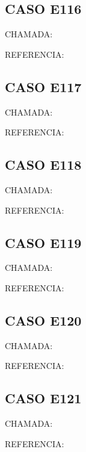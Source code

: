 \documentclass{undftex}
\begin{document}
\begin{refsection}\section*{CASO E116}\noindent CHAMADA:  \par\noindent REFERENCIA:\par\printbibliography[heading=none,check=undfconsultadas]\end{refsection}\clearpage
\begin{refsection}\section*{CASO E117}\noindent CHAMADA:  \par\noindent REFERENCIA:\par\printbibliography[heading=none,check=undfconsultadas]\end{refsection}\clearpage
\begin{refsection}\section*{CASO E118}\noindent CHAMADA:  \par\noindent REFERENCIA:\par\printbibliography[heading=none,check=undfconsultadas]\end{refsection}\clearpage
\begin{refsection}\section*{CASO E119}\noindent CHAMADA:  \par\noindent REFERENCIA:\par\printbibliography[heading=none,check=undfconsultadas]\end{refsection}\clearpage
\begin{refsection}\section*{CASO E120}\noindent CHAMADA:  \par\noindent REFERENCIA:\par\printbibliography[heading=none,check=undfconsultadas]\end{refsection}\clearpage
\begin{refsection}\section*{CASO E121}\noindent CHAMADA:  \par\noindent REFERENCIA:\par\printbibliography[heading=none,check=undfconsultadas]\end{refsection}\clearpage
\end{document}
